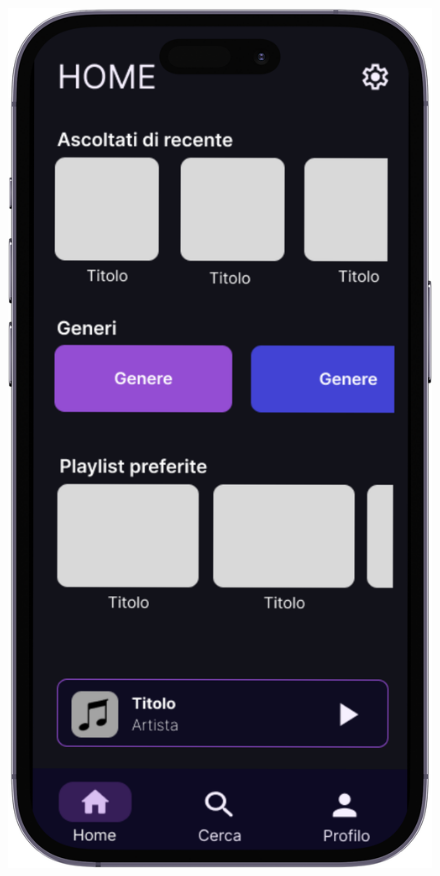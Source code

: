 \documentclass{article}
\begin{document}
\begin{figure}[htbp]
\begin{minipage}{0.18\textwidth}
					\includegraphics[width=\textwidth]{Immagini/foto3}
				\end{minipage}
				\hfill
				\begin{minipage}{0.18\textwidth}

\end{minipage}
\end{figure}
\end{document}
